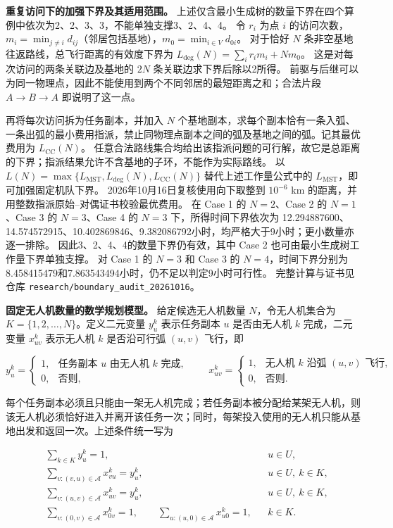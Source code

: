 \documentclass[UTF8,a4paper,12pt]{ctexart}
\numberwithin{equation}{section}
\numberwithin{equation}{section}
\begin{document}
\noindent\textbf{重复访问下的加强下界及其适用范围。}
上述仅含最小生成树的数量下界在四个算例中依次为2、2、3、3，不能单独支撑3、2、4、4。
令 $r_i$ 为点 $i$ 的访问次数，$m_i=\min_{j\ne i}d_{ij}$（邻居包括基地），$m_0=\min_{i\in V}d_{0i}$。
对于恰好 $N$ 条非空基地往返路线，总飞行距离的有效度下界为
$L_{\mathrm{deg}}(N)=\sum_i r_i m_i+Nm_0$。
这是对每次访问的两条关联边及基地的 $2N$ 条关联边求下界后除以2所得。
前驱与后继可以为同一物理点，因此不能使用到两个不同邻居的最短距离之和；合法片段 $A\to B\to A$ 即说明了这一点。

再将每次访问拆为任务副本，并加入 $N$ 个基地副本，求每个副本恰有一条入弧、一条出弧的最小费用指派，禁止同物理点副本之间的弧及基地之间的弧。记其最优费用为 $L_{\mathrm{CC}}(N)$。
任意合法路线集合均给出该指派问题的可行解，故它是总距离的下界；指派结果允许不含基地的子环，不能作为实际路线。
以 $L(N)=\max\{L_{\mathrm{MST}},L_{\mathrm{deg}}(N),L_{\mathrm{CC}}(N)\}$ 替代上述工作量公式中的 $L_{\mathrm{MST}}$，即可加强固定机队下界。
2026年10月16日复核使用向下取整到 $10^{-6}$ km 的距离，并用整数指派原始--对偶证书校验最优费用。
在 Case 1 的 $N=2$、Case 2 的 $N=1$、Case 3 的 $N=3$、Case 4 的 $N=3$ 下，所得时间下界依次为
12.294887600、14.574572915、10.402869846、9.382086792小时，均严格大于9小时；更小数量亦逐一排除。
因此3、2、4、4的数量下界仍有效，其中 Case 2 也可由最小生成树工作量下界单独支撑。
对 Case 1 的 $N=3$ 和 Case 3 的 $N=4$，时间下界分别为8.458415479和7.863543494小时，仍不足以判定9小时可行性。
完整计算与证书见仓库 \texttt{research/boundary\_audit\_20261016}。

\noindent\textbf{固定无人机数量的数学规划模型。}
给定候选无人机数量 \(N\)，令无人机集合为 \(K=\{1,2,\ldots,N\}\)。定义二元变量 \(y_u^k\) 表示任务副本 \(u\) 是否由无人机 \(k\) 完成，二元变量 \(x_{uv}^k\) 表示无人机 \(k\) 是否沿可行弧 \((u,v)\) 飞行，即

\[
y_u^k=
\begin{cases}
1, & \text{任务副本 }u\text{ 由无人机 }k\text{ 完成},\\
0, & \text{否则},
\end{cases}
\qquad
x_{uv}^k=
\begin{cases}
1, & \text{无人机 }k\text{ 沿弧 }(u,v)\text{ 飞行},\\
0, & \text{否则}.
\end{cases}
\]

每个任务副本必须且只能由一架无人机完成；若任务副本被分配给某架无人机，则该无人机必须恰好进入并离开该任务一次；同时，每架投入使用的无人机只能从基地出发和返回一次。上述条件统一写为

\begin{equation}
\begin{aligned}
  &\sum_{k\in K}y_u^k=1,
  &&u\in U,\\
  &\sum_{v:(v,u)\in\mathcal A}x_{vu}^k=y_u^k,
  &&u\in U,\ k\in K,\\
  &\sum_{v:(u,v)\in\mathcal A}x_{uv}^k=y_u^k,
  &&u\in U,\ k\in K,\\
  &\sum_{v:(0,v)\in\mathcal A}x_{0v}^k=1,
  \qquad
  \sum_{u:(u,0)\in\mathcal A}x_{u0}^k=1,
  &&k\in K.
\end{aligned}
\label{eq:q1-route-constraints}
\end{equation}
\end{document}
